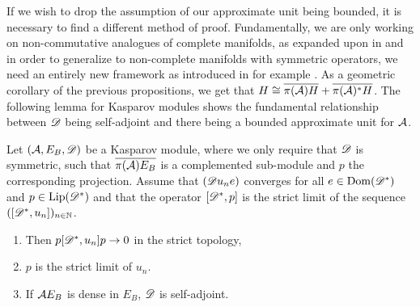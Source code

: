 If we wish to drop the assumption of our approximate unit being bounded, it is necessary to find a different method of proof. Fundamentally, we are only working on non-commutative analogues of complete manifolds, as expanded upon in \cite[Section 2]{mesrennie} and in order to generalize to non-complete manifolds with symmetric operators, we need an entirely new framework as introduced in for example \cite{kaad}. 
As a geometric corollary of the previous propositions, we get that $H\cong \overline{\pi(\mathcal{A})H}+\overline{\pi(\mathcal{A})^*H}$. 
The following lemma for Kasparov modules shows the fundamental relationship between $\mathscr{D}$ being self-adjoint and there being a bounded approximate unit for $\mathcal{A}$. 
\begin{theorem}\label{mesrennie19}
	Let $(\mathcal{A},E_B,\mathscr{D})$ be a Kasparov module, where we only require that $\mathscr{D}$ is symmetric, such that $\overline{\pi(\mathcal{A})E_B}$ is a complemented sub-module and $p$ the corresponding projection. Assume that $(\mathscr{D} u_ne)$ converges for all $e\in \operatorname{Dom}(\mathscr{D}^*)$ and $p\in \operatorname{Lip}(\mathscr{D}^*)$ and that the operator $[\mathscr{D}^*,p]$ is the strict limit of the sequence $([\mathscr{D}^*,u_n])_{n\in \mathbb{N}}$. 
	\begin{enumerate}
	\item
		Then $p[\mathscr{D}^*,u_n]p\to 0$ in the strict topology,  
	\item
		$p$ is the strict limit of $u_n$.  
	\item
		If $\mathcal{A} E_B$ is dense in $E_B$, $\mathscr{D}$ is self-adjoint. 
	\end{enumerate}
\end{theorem}
